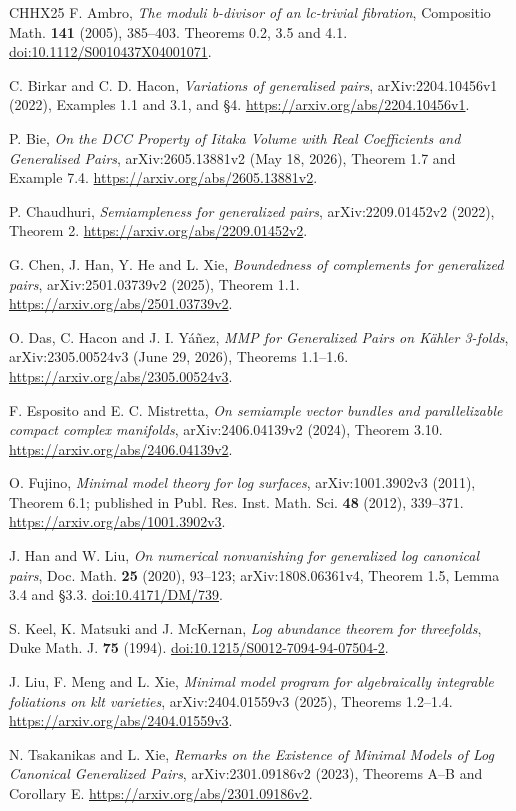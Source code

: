 \documentclass[12pt]{amsart}
\theoremstyle{definition}
\theoremstyle{remark}
\numberwithin{equation}{section}
\begin{document}
\begin{thebibliography}{CHHX25}
F. Ambro, \emph{The moduli b-divisor of an lc-trivial fibration}, Compositio Math. \textbf{141} (2005), 385--403. Theorems 0.2, 3.5 and 4.1. \href{https://doi.org/10.1112/S0010437X04001071}{doi:10.1112/S0010437X04001071}.

C. Birkar and C. D. Hacon, \emph{Variations of generalised pairs}, arXiv:2204.10456v1 (2022), Examples 1.1 and 3.1, and \S4. \url{https://arxiv.org/abs/2204.10456v1}.

P. Bie, \emph{On the DCC Property of Iitaka Volume with Real Coefficients and Generalised Pairs}, arXiv:2605.13881v2 (May 18, 2026), Theorem 1.7 and Example 7.4. \url{https://arxiv.org/abs/2605.13881v2}.

P. Chaudhuri, \emph{Semiampleness for generalized pairs}, arXiv:2209.01452v2 (2022), Theorem 2. \url{https://arxiv.org/abs/2209.01452v2}.

G. Chen, J. Han, Y. He and L. Xie, \emph{Boundedness of complements for generalized pairs}, arXiv:2501.03739v2 (2025), Theorem 1.1. \url{https://arxiv.org/abs/2501.03739v2}.

O. Das, C. Hacon and J. I. Y\'a\~nez, \emph{MMP for Generalized Pairs on K\"ahler 3-folds}, arXiv:2305.00524v3 (June 29, 2026), Theorems 1.1--1.6. \url{https://arxiv.org/abs/2305.00524v3}.

F. Esposito and E. C. Mistretta, \emph{On semiample vector bundles and parallelizable compact complex manifolds}, arXiv:2406.04139v2 (2024), Theorem 3.10. \url{https://arxiv.org/abs/2406.04139v2}.

O. Fujino, \emph{Minimal model theory for log surfaces}, arXiv:1001.3902v3 (2011), Theorem 6.1; published in Publ. Res. Inst. Math. Sci. \textbf{48} (2012), 339--371. \url{https://arxiv.org/abs/1001.3902v3}.

J. Han and W. Liu, \emph{On numerical nonvanishing for generalized log canonical pairs}, Doc. Math. \textbf{25} (2020), 93--123; arXiv:1808.06361v4, Theorem 1.5, Lemma 3.4 and \S3.3. \href{https://doi.org/10.4171/DM/739}{doi:10.4171/DM/739}.

S. Keel, K. Matsuki and J. McKernan, \emph{Log abundance theorem for threefolds}, Duke Math. J. \textbf{75} (1994). \href{https://doi.org/10.1215/S0012-7094-94-07504-2}{doi:10.1215/S0012-7094-94-07504-2}.

J. Liu, F. Meng and L. Xie, \emph{Minimal model program for algebraically integrable foliations on klt varieties}, arXiv:2404.01559v3 (2025), Theorems 1.2--1.4. \url{https://arxiv.org/abs/2404.01559v3}.

N. Tsakanikas and L. Xie, \emph{Remarks on the Existence of Minimal Models of Log Canonical Generalized Pairs}, arXiv:2301.09186v2 (2023), Theorems A--B and Corollary E. \url{https://arxiv.org/abs/2301.09186v2}.

\end{thebibliography}
\end{document}
